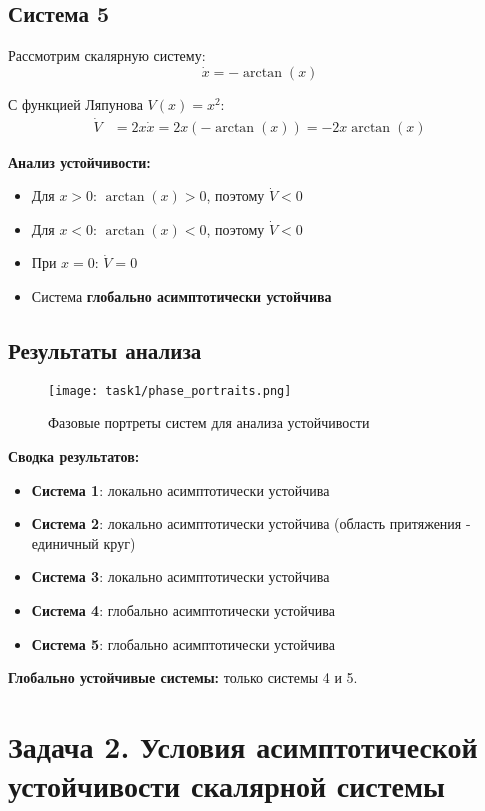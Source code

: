 \subsection{Система 5}

Рассмотрим скалярную систему:
\begin{equation}
\dot{x} = -\arctan(x)
\end{equation}

С функцией Ляпунова $V(x) = x^2$:
\begin{align}
\dot{V} &= 2x \dot{x} = 2x(-\arctan(x)) = -2x\arctan(x)
\end{align}

\textbf{Анализ устойчивости:}
\begin{itemize}
\item Для $x > 0$: $\arctan(x) > 0$, поэтому $\dot{V} < 0$
\item Для $x < 0$: $\arctan(x) < 0$, поэтому $\dot{V} < 0$
\item При $x = 0$: $\dot{V} = 0$
\item Система \textbf{глобально асимптотически устойчива}
\end{itemize}

\subsection{Результаты анализа}

\begin{figure}[H]
\centering
\texttt{[image: task1/phase\_portraits.png]}
\caption{Фазовые портреты систем для анализа устойчивости}
\label{fig:phase_portraits}
\end{figure}

\textbf{Сводка результатов:}
\begin{itemize}
\item \textbf{Система 1}: локально асимптотически устойчива
\item \textbf{Система 2}: локально асимптотически устойчива (область притяжения - единичный круг)
\item \textbf{Система 3}: локально асимптотически устойчива
\item \textbf{Система 4}: глобально асимптотически устойчива
\item \textbf{Система 5}: глобально асимптотически устойчива
\end{itemize}

\textbf{Глобально устойчивые системы:} только системы 4 и 5.

\section{Задача 2. Условия асимптотической устойчивости скалярной системы}

